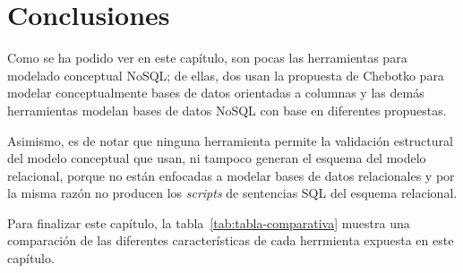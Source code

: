 \section{Conclusiones}

Como se ha podido ver en este capítulo, son pocas las herramientas para modelado conceptual NoSQL; de ellas, dos usan la propuesta de Chebotko para modelar conceptualmente bases de datos orientadas a columnas y las demás herramientas modelan bases de datos NoSQL con base en diferentes propuestas.


Asimismo, es de notar que ninguna herramienta permite la validación estructural del modelo conceptual que usan, ni tampoco generan el esquema del modelo relacional, porque no están enfocadas a modelar bases de datos relacionales y por la misma razón no producen los \textit{scripts} de sentencias SQL del esquema relacional.


Para finalizar este capítulo, la tabla~\ref{tab:tabla-comparativa} muestra una comparación de las diferentes características de cada herrmienta expuesta en este capítulo.

